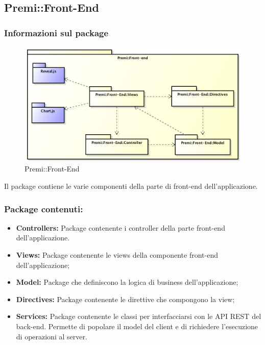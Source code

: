 \subsection{Premi::Front-End}
	\subsubsection*{Informazioni sul package}
		\begin{figure}[h]
			\centering
			\includegraphics[width=\linewidth]{img/front-end_package}
			\caption[Premi::Front-End]{Premi::Front-End}
		\end{figure}
		Il package contiene le varie componenti della parte di \gls{front-end} dell'applicazione.

		\subsubsection*{Package contenuti:}
			\begin{itemize}
				\item \textbf{Controllers:} Package contenente i controller della parte \gls{front-end} dell'applicazione.
				\item \textbf{Views:} Package contenente le views della componente \gls{front-end} dell'applicazione;
				\item \textbf{Model:} Package che definiscono la logica di business dell'applicazione;
				\item \textbf{Directives:} Package contenente le direttive che compongono la view;
				\item \textbf{Services:} Package contenente le classi per interfacciarsi con le API REST del \gls{back-end}. Permette di popolare il model del client e di richiedere l'esecuzione di operazioni al server.
			\end{itemize}

